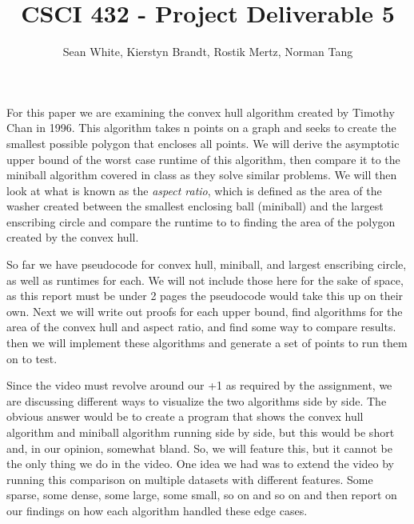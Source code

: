 \documentclass[12pt]{article}
\author{Sean White, Kierstyn Brandt, Rostik Mertz, Norman Tang}
\title{CSCI 432 - Project Deliverable 5}
\begin{document}
\maketitle

For this paper we are examining the convex hull algorithm created by Timothy Chan in 1996. This algorithm takes n points on a graph and seeks to create the smallest possible polygon that encloses all points. We will derive the asymptotic upper bound of the worst case runtime of this algorithm, then compare it to the miniball algorithm covered in class as they solve similar problems. We will then look at what is known as the \textit{aspect ratio}, which is defined as the area of the washer created between the smallest enclosing ball (miniball) and the largest enscribing circle and compare the runtime to to finding the area of the polygon created by the convex hull.

So far we have pseudocode for convex hull, miniball, and largest enscribing circle, as well as runtimes for each. We will not include those here for the sake of space, as this report must be under 2 pages the pseudocode would take this up on their own. Next we will write out proofs for each upper bound, find algorithms for the area of the convex hull and aspect ratio, and find some way to compare results. then we will implement these algorithms and generate a set of points to run them on to test. 

Since the video must revolve around our +1 as required by the assignment, we are discussing different ways to visualize the two algorithms side by side. The obvious answer would be to create a program that shows the convex hull algorithm and miniball algorithm running side by side, but this would be short and, in our opinion, somewhat bland. So, we will feature this, but it cannot be the only thing we do in the video. One idea we had was to extend the video by running this comparison on multiple datasets with different features. Some sparse, some dense, some large, some small, so on and so on and then report on our findings on how each algorithm handled these edge cases.
\end{document}
